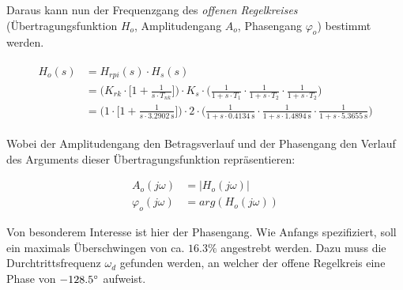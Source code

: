 Daraus   kann   nun   der   Frequenzgang   des   {\em{offenen   Regelkreises}}
(\"Ubertragungsfunktion $H_o$,  Amplitudengang $A_o$,  Phasengang $\varphi_o$)
bestimmt werden.

\begin{gather} \label{eq:pi:h_open}
    \begin{split}
        H_o (s) & = H_{rpi} (s) \cdot H_s (s) \\
            & = \Biggl(
                    K_{rk} \cdot \biggl[ 1 + \frac{1}{s \cdot T_{nk}} \biggr]
                \Biggr)
                \cdot
                K_s
                \cdot
                \Biggl(
                        \frac{1}{1 + s \cdot T_1}
                  \cdot \frac{1}{1 + s \cdot T_2}
                  \cdot \frac{1}{1 + s \cdot T_2}
                \Biggr) \\
            & = \Biggl(
                    1 \cdot \biggl[ 1 + \frac{1}{s \cdot \SI{3.2902}{\second}} \biggr]
                \Biggr)
                \cdot
                2
                \cdot
                \Biggl(
                          \frac{1}{1 + s \cdot \SI{0.4134}{\second}}
                    \cdot \frac{1}{1 + s \cdot \SI{1.4894}{\second}}
                    \cdot \frac{1}{1 + s \cdot \SI{5.3655}{\second}}
                \Biggr)
    \end{split}
\end{gather}


Wobei der Amplitudengang den Betragsverlauf und der Phasengang den Verlauf des
Arguments dieser \"Ubertragungsfunktion repr\"asentieren:

\begin{equation}
    \begin{split} \label{eq:pi:a_o_phi_o}
        A_o(j\omega)       & = |H_o(j\omega)| \\
        \varphi_o(j\omega) & = arg(H_o(j\omega))
    \end{split}
\end{equation}

Von besonderem  Interesse ist  hier der Phasengang. Wie  Anfangs spezifiziert,
soll  ein maximals  \"Uberschwingen von  ca. $16.3\%$ angestrebt  werden. Dazu
muss die Durchtrittsfrequenz $\omega_d$ gefunden werden, an welcher der offene
Regelkreis eine Phase von $-128.5\degree$ aufweist. \footnotemark[2]


